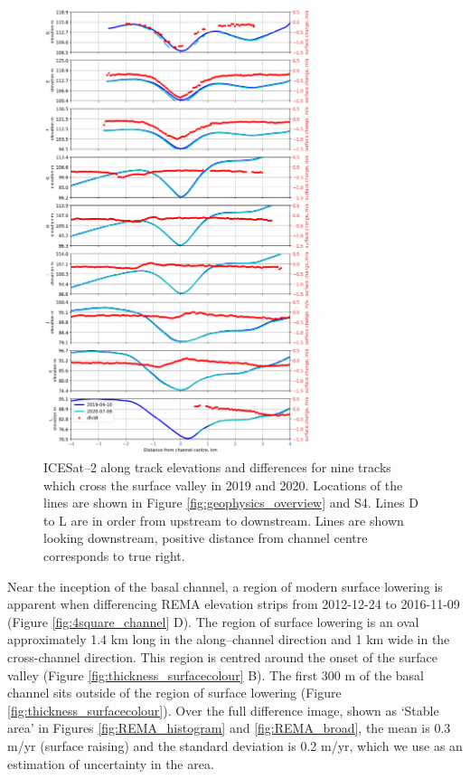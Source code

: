\begin{figure}[!ht]
\centering
\includegraphics[width=0.7\textwidth]{chapters/2/icesat2_b.png}
\caption[ICESat--2 profiles]{ICESat--2 along track elevations and differences for nine tracks which cross the surface valley in 2019 and 2020. Locations of the lines are shown in Figure \ref{fig:geophysics_overview} and S4. Lines D to L are in order from upstream to downstream. Lines are shown looking downstream, positive distance from channel centre corresponds to true right.
 }
\label{fig:icesat2_b}
\end{figure}


Near the inception of the basal channel, a region of modern surface lowering is apparent when differencing REMA elevation strips from 2012-12-24 to 2016-11-09 (Figure  \ref{fig:4square_channel} D). The region of surface lowering is an oval approximately 1.4 km long in the along--channel direction and 1 km wide in the cross-channel direction. This region is centred around the onset of the surface valley (Figure \ref{fig:thickness_surfacecolour} B).  The first 300 m of the basal channel sits outside of the region of surface lowering  (Figure \ref{fig:thickness_surfacecolour}). Over the full difference image, shown as `Stable area' in Figures \ref{fig:REMA_histogram} and \ref{fig:REMA_broad}, the mean is 0.3 m/yr (surface raising) and the standard deviation is 0.2 m/yr, which we use as an estimation of uncertainty in the area. 

